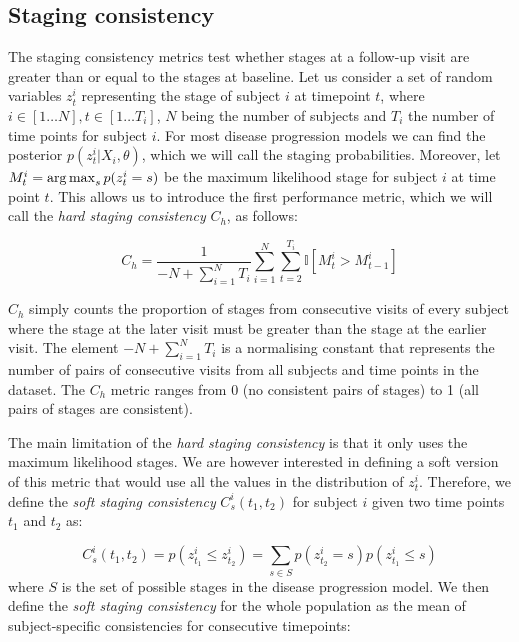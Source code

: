\subsection{Staging consistency}
\label{sec:stagingConsist}

The staging consistency metrics test whether stages at a follow-up visit are greater than or equal to the stages at baseline. Let us consider a set of random variables $z_t^i$ representing the stage of subject $i$ at timepoint $t$, where $i \in [1 \dots N], t \in [1 \dots T_i]$, $N$ being the number of subjects and $T_i$ the number of time points for subject $i$. For most disease progression models we can find the posterior $p(z_t^i|X_i, \theta)$, which we will call the staging probabilities. Moreover, let $M^i_t = \operatorname*{arg\,max}_s p(z_t^i = s)$ be the maximum likelihood stage for subject $i$ at time point $t$. This allows us to introduce the first performance metric, which we will call the \emph{hard staging consistency} $C_h$, as follows:

\begin{equation}
 C_h = \frac{1}{-N +\sum_{i=1}^N T_i} \sum_{i=1}^N \sum_{t=2}^{T_i} \mathbb{I}[M^i_t > M^i_{t-1}] 
\end{equation}

$C_h$ simply counts the proportion of stages from consecutive visits of every subject where the stage at the later visit must be greater than the stage at the earlier visit. The element $-N +\sum_{i=1}^N T_i$ is a normalising constant that represents the number of pairs of consecutive visits from all subjects and time points in the dataset. The $C_h$ metric ranges from 0 (no consistent pairs of stages) to 1 (all pairs of stages are consistent).

The main limitation of the \emph{hard staging consistency} is that it only uses the maximum likelihood stages. We are however interested in defining a soft version of this metric that would use all the values in the distribution of $z_t^i$. Therefore, we define the \emph{soft staging consistency} $C_s^i(t_1,t_2)$ for subject $i$ given two time points $t_1$ and $t_2$ as:

\begin{equation}
C_s^i(t_1,t_2) = p(z^i_{t_1} \leq z^i_{t_2}) = \sum_{s \in S} p(z^i_{t_2} = s) p(z^i_{t_1} \leq s) 
\end{equation}
where $S$ is the set of possible stages in the disease progression model. We then define the \emph{soft staging consistency} for the whole population as the mean of subject-specific consistencies for consecutive timepoints:

